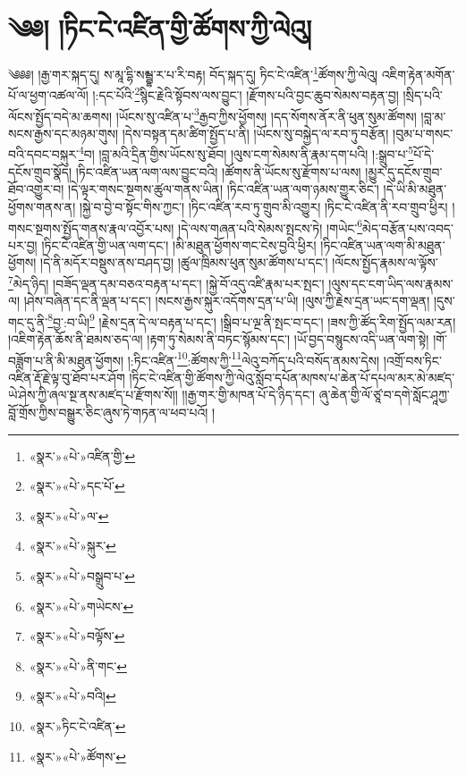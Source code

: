\chapter{༄༅། །ཏིང་ངེ་འཛིན་གྱི་ཚོགས་ཀྱི་ལེའུ།}༄༅༅། །རྒྱ་གར་སྐད་དུ། ས་མཱ་དྷི་སམྦྷ་ར་པ་རི་བརྟ། བོད་སྐད་དུ། ཏིང་ངེ་འཛིན་\footnote{«སྣར་»«པེ་»འཛིན་གྱི་}ཚོགས་ཀྱི་ལེའུ། འཇིག་རྟེན་མགོན་པོ་ལ་ཕྱག་འཚལ་ལོ། །:དང་པོའི་\footnote{«སྣར་»«པེ་»དང་པོ་}སྙིང་རྗེའི་སྟོབས་ལས་བྱུང་། །རྫོགས་པའི་བྱང་ཆུབ་སེམས་བརྟན་བྱ། །སྲིད་པའི་ལོངས་སྤྱོད་བདེ་མ་ཆགས། །ཡོངས་སུ་འཛིན་པ་\footnote{«སྣར་»«པེ་»ལ་}རྒྱབ་ཀྱིས་ཕྱོགས། །དད་སོགས་ནོར་ནི་ཕུན་སུམ་ཚོགས། །བླ་མ་སངས་རྒྱས་དང་མཉམ་གུས། །དེས་བསྟན་དམ་ཚིག་སྤྱོད་པ་ནི། །ཡོངས་སུ་བསྐྱེད་ལ་རབ་ཏུ་བརྩོན། །བུམ་པ་གསང་བའི་དབང་བསྐུར་\footnote{«སྣར་»«པེ་»སྐུར་}བ། །བླ་མའི་དྲིན་གྱིས་ཡོངས་སུ་ཐོབ། །ལུས་ངག་སེམས་ནི་རྣམ་དག་པའི། །:སྒྲུབ་པ་\footnote{«སྣར་»«པེ་»བསྒྲུབ་པ་}པོ་དེ་དངོས་གྲུབ་སྣོད། །ཏིང་འཛིན་ཡན་ལག་ལས་བྱུང་བའི། །ཚོགས་ནི་ཡོངས་སུ་རྫོགས་པ་ལས། །མྱུར་དུ་དངོས་གྲུབ་ཐོབ་འགྱུར་བ། །དེ་ལྟར་གསང་སྔགས་ཚུལ་གནས་ཡིན། །ཏིང་འཛིན་ཡན་ལག་ཉམས་གྱུར་ཅིང་། །དེ་ཡི་མི་མཐུན་ཕྱོགས་གནས་ན། །སྐྱེ་བ་བྱེ་བ་སྟོང་གིས་ཀྱང་། །ཏིང་འཛིན་རབ་ཏུ་གྲུབ་མི་འགྱུར། །ཏིང་ངེ་འཛིན་ནི་རབ་གྲུབ་ཕྱིར། །གསང་སྔགས་སྤྱོད་གནས་རྣལ་འབྱོར་པས། །དེ་ལས་གཞན་པའི་སེམས་སྤངས་ཏེ། །གཡེང་\footnote{«སྣར་»«པེ་»གཡེངས་}མེད་བརྩོན་པས་འབད་པར་བྱ། །ཏིང་ངེ་འཛིན་གྱི་ཡན་ལག་དང་། །མི་མཐུན་ཕྱོགས་གང་ངེས་བྱའི་ཕྱིར། །ཏིང་འཛིན་ཡན་ལག་མི་མཐུན་ཕྱོགས། །དེ་ནི་མདོར་བསྡུས་ནས་བཤད་བྱ། །ཚུལ་ཁྲིམས་ཕུན་སུམ་ཚོགས་པ་དང་། །ལོངས་སྤྱོད་རྣམས་ལ་ལྟོས་\footnote{«སྣར་»«པེ་»བལྟོས་}མེད་ཉིད། །བཟོད་ལྡན་དམ་བཅའ་བརྟན་པ་དང་། །སྐྱེ་བོ་འདུ་འཛི་རྣམ་པར་སྤང་། །ལུས་དང་ངག་ཡིད་ལས་རྣམས་ལ། །ཤེས་བཞིན་དང་ནི་ལྡན་པ་དང་། །སངས་རྒྱས་སྐུར་འདོགས་དྲན་པ་ཡི། །ལུས་ཀྱི་རྗེས་དྲན་ཡང་དག་ལྡན། །དུས་གང་དུ་ནི་\footnote{«སྣར་»«པེ་»ནི་གང་}བྱ་:བ་ཡི།\footnote{«སྣར་»«པེ་»བའི།} །རྗེས་དྲན་དེ་ལ་བརྟན་པ་དང་། །སྒྲིབ་པ་ལྔ་ནི་སྤང་བ་དང་། །ཟས་ཀྱི་ཚོད་རིག་སྤྱོད་ལམ་རན། །འཇིག་རྟེན་ཆོས་ནི་ཐམས་ཅད་ལ། །རྟག་ཏུ་སེམས་ནི་བཏང་སྙོམས་དང་། །ཡོ་བྱད་བསྙུངས་འདི་ཡན་ལག་སྟེ། །གོ་བཟློག་པ་ནི་མི་མཐུན་ཕྱོགས། །:ཏིང་འཛིན་\footnote{«སྣར་»ཏིང་ངེ་འཛིན་}:ཚོགས་ཀྱི་\footnote{«སྣར་»«པེ་»ཚོགས་}ལེའུ་བཀོད་པའི་བསོད་ནམས་དེས། །འགྲོ་བས་ཏིང་འཛིན་རྡོ་རྗེ་ལྟ་བུ་ཐོབ་པར་ཤོག །ཏིང་ངེ་འཛིན་གྱི་ཚོགས་ཀྱི་ལེའུ་སློབ་དཔོན་མཁས་པ་ཆེན་པོ་དཔལ་མར་མེ་མཛད་ཡེ་ཤེས་ཀྱི་ཞལ་སྔ་ནས་མཛད་པ་རྫོགས་སོ།། །།རྒྱ་གར་གྱི་མཁན་པོ་དེ་ཉིད་དང་། ཞུ་ཆེན་གྱི་ལོ་ཙཱ་བ་དགེ་སློང་ཤཱཀྱ་བློ་གྲོས་ཀྱིས་བསྒྱུར་ཅིང་ཞུས་ཏེ་གཏན་ལ་ཕབ་པའོ། །
 